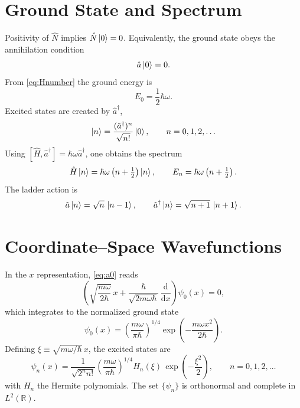\documentclass[12pt]{article}
\numberwithin{equation}{section}
\newcommand{\dd}{\mathrm d}
\newcommand{\h}{\hbar}
\newcommand{\w}{\omega}
\begin{document}
\section{Ground State and Spectrum}
Positivity of $\hat N$ implies $\hat N\ket{0}=0$. Equivalently, the ground state obeys the annihilation condition
\begin{equation}
\hat a\ket{0}=0.
\label{eq:a0}
\end{equation}
From \eqref{eq:Hnumber} the ground energy is
\begin{equation}
E_0=\frac12\h\w.
\label{eq:E0}
\end{equation}
Excited states are created by $\hat a^{\dagger}$,
\begin{equation}
\ket{n}=\frac{(\hat a^{\dagger})^n}{\sqrt{n!}}\ket{0}, \qquad n=0,1,2,\dots
\label{eq:states}
\end{equation}
Using $[\hat H,\hat a^{\dagger}]=\h\w\hat a^{\dagger}$, one obtains the spectrum
\begin{equation}
\hat H\ket{n}=\h\w\left(n+\tfrac12\right)\ket{n},\qquad E_n=\h\w\left(n+\tfrac12\right).
\label{eq:En}
\end{equation}
The ladder action is
\begin{equation}
\hat a\ket{n}=\sqrt{n}\,\ket{n-1},\qquad \hat a^{\dagger}\ket{n}=\sqrt{n+1}\,\ket{n+1}.
\label{eq:ladderaction}
\end{equation}

\section{Coordinate--Space Wavefunctions}
In the $x$ representation, \eqref{eq:a0} reads
\begin{equation}
\left(\sqrt{\frac{m\w}{2\h}}\,x+\frac{\h}{\sqrt{2m\w\h}}\,\frac{\dd}{\dd x}\right)\psi_0(x)=0,
\end{equation}
which integrates to the normalized ground state
\begin{equation}
\psi_0(x)=\left(\frac{m\w}{\pi\h}\right)^{1/4}\!\exp\!\left(-\frac{m\w x^2}{2\h}\right).
\label{eq:psi0}
\end{equation}
Defining $\xi\equiv\sqrt{m\w/\h}\,x$, the excited states are
\begin{equation}
\psi_n(x)=\frac{1}{\sqrt{2^n n!}}\left(\frac{m\w}{\pi\h}\right)^{1/4}H_n(\xi)\,\exp\!\left(-\frac{\xi^2}{2}\right), \qquad n=0,1,2,\dots
\label{eq:psin}
\end{equation}
with $H_n$ the Hermite polynomials. The set $\{\psi_n\}$ is orthonormal and complete in $L^2(\mathbb R)$.
\end{document}

